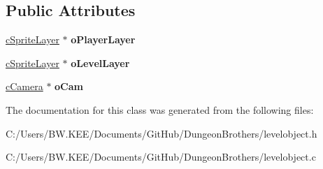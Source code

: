 \subsection*{Public Attributes}
\begin{DoxyCompactItemize}
\item 
\hypertarget{classc_level_object_adef4d9f84d178e332e769a324eed527e}{\hyperlink{classc_sprite_layer}{c\-Sprite\-Layer} $\ast$ {\bfseries o\-Player\-Layer}}\label{classc_level_object_adef4d9f84d178e332e769a324eed527e}

\item 
\hypertarget{classc_level_object_a679fa5636166989650b6b08198812f12}{\hyperlink{classc_sprite_layer}{c\-Sprite\-Layer} $\ast$ {\bfseries o\-Level\-Layer}}\label{classc_level_object_a679fa5636166989650b6b08198812f12}

\item 
\hypertarget{classc_level_object_adb5d526afbfcf50d3884e0d6c7f97e68}{\hyperlink{classc_camera}{c\-Camera} $\ast$ {\bfseries o\-Cam}}\label{classc_level_object_adb5d526afbfcf50d3884e0d6c7f97e68}

\end{DoxyCompactItemize}


The documentation for this class was generated from the following files\-:\begin{DoxyCompactItemize}
\item 
C\-:/\-Users/\-B\-W.\-K\-E\-E/\-Documents/\-Git\-Hub/\-Dungeon\-Brothers/levelobject.\-h\item 
C\-:/\-Users/\-B\-W.\-K\-E\-E/\-Documents/\-Git\-Hub/\-Dungeon\-Brothers/levelobject.\-c\end{DoxyCompactItemize}
